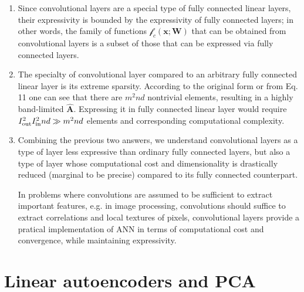 \documentclass[a4paper, 10pt]{article}
\begin{document}
\begin{enumerate}[label=(\alph*)]
    \item Since convolutional layers are a special type of fully connected linear layers, their expressivity is bounded by the expressivity of fully connected layers; in other words, the family of functions $\mathscr{f}_c(\mathbf{x}; \mathbf{W})$ that can be obtained from convolutional layers is a subset of those that can be expressed via fully connected layers.
    
    \item The specialty of convolutional layer compared to an arbitrary fully connected linear layer is its extreme sparsity. According to the original form or from Eq. 11 one can see that there are $m^2nd$ nontrivial elements, resulting in a highly band-limited $\mathbf{\widehat{A}}$. Expressing it in fully connected linear layer would require $I_{\rm out}^2 I_{\rm in}^2 nd \gg m^2 nd$ elements and corresponding computational complexity.
    
    \item Combining the previous two answers, we understand convolutional layers as a type of layer less expressive than ordinary fully connected layers, but also a type of layer whose computational cost and dimensionality is drastically reduced (marginal to be precise) compared to its fully connected counterpart.
    
    In problems where convolutions are assumed to be sufficient to extract important features, e.g. in image processing, convolutions should suffice to extract correlations and local textures of pixels, convolutional layers provide a pratical implementation of ANN in terms of computational cost and convergence, while maintaining expressivity.
\end{enumerate}

\section{Linear autoencoders and PCA}
\end{document}
